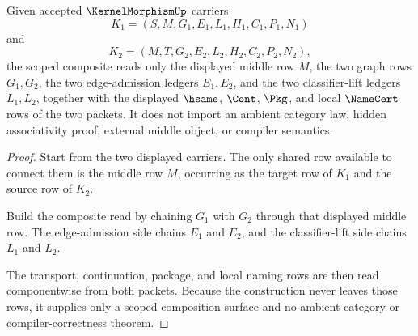 \begin{theorem}
\label{thm:kernel-morphism-composition-scope}
Given accepted $\KernelMorphismUp$ carriers
$$
K_{1}=(S,M,G_{1},E_{1},L_{1},H_{1},C_{1},P_{1},N_{1})
$$
and
$$
K_{2}=(M,T,G_{2},E_{2},L_{2},H_{2},C_{2},P_{2},N_{2}),
$$
the scoped composite reads only the displayed middle row $M$, the two graph rows $G_{1},G_{2}$, the two edge-admission ledgers $E_{1},E_{2}$, and the two classifier-lift ledgers $L_{1},L_{2}$, together with the displayed $\hsame$, $\Cont$, $\Pkg$, and local $\NameCert$ rows of the two packets. It does not import an ambient category law, hidden associativity proof, external middle object, or compiler semantics.
\end{theorem}
\begin{proof}
Start from the two displayed carriers. The only shared row available to connect them is the middle row $M$, occurring as the target row of $K_{1}$ and the source row of $K_{2}$.

Build the composite read by chaining $G_{1}$ with $G_{2}$ through that displayed middle row. The edge-admission side chains $E_{1}$ and $E_{2}$, and the classifier-lift side chains $L_{1}$ and $L_{2}$.

The transport, continuation, package, and local naming rows are then read componentwise from both packets. Because the construction never leaves those rows, it supplies only a scoped composition surface and no ambient category or compiler-correctness theorem.
\end{proof}

